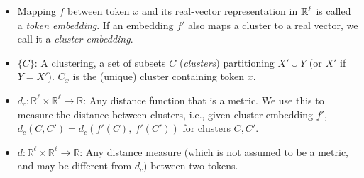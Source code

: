 \begin{itemize}
\setlength\itemsep{0em}

    \item Mapping $f$ between token $x$  and its real-vector representation in $\mathbb{R}^\ell$ is called a {\em token embedding}. If an embedding $f'$ also maps a cluster to a real vector, we call it a {\em cluster embedding}.
    \item $\{C\}$: A clustering, a set of subsets $C$ ({\em clusters}) partitioning $X'\cup Y$ (or $X'$ if $Y = X'$).  $C_x$ is the (unique) cluster  containing token $x$.
    \item $d_c: \mathbb{R}^\ell \times \mathbb{R}^\ell \rightarrow \mathbb{R}$: Any distance function that is a metric. We use this to measure the distance between clusters, i.e., given cluster embedding $f'$, $d_c(C, C') = d_c\left(f'(C),\ f'(C') \right)$ for clusters $C, C'$.
    \item $d: \mathbb{R}^\ell \times \mathbb{R}^\ell \rightarrow \mathbb{R}$: Any distance measure (which is not assumed to be a metric, and may be different from $d_c$) between two tokens.
\end{itemize}



